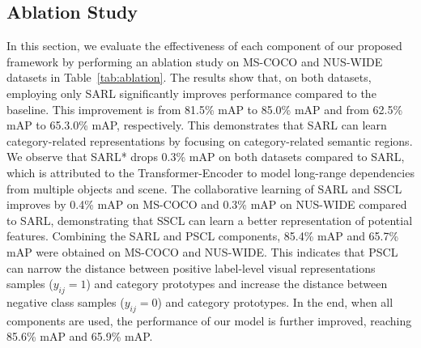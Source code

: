 \documentclass{ecai}
\begin{document}
\subsection{Ablation Study}
In this section, we evaluate the effectiveness of each component of our proposed framework by performing an ablation study on MS-COCO and NUS-WIDE datasets in Table~\ref{tab:ablation}.
The results show that, on both datasets, employing only SARL significantly improves performance compared to the baseline. This improvement is from 81.5\% mAP to 85.0\% mAP and from 62.5\% mAP to 65.3.0\% mAP, respectively.
This demonstrates that SARL can learn category-related representations by focusing on category-related semantic regions.
We observe that SARL* drops 0.3\% mAP on both datasets compared to SARL, which is attributed to the Transformer-Encoder to model long-range dependencies from multiple objects and scene.
The collaborative learning of SARL and SSCL improves by 0.4\% mAP on MS-COCO and 0.3\% mAP on NUS-WIDE compared to SARL, demonstrating that SSCL can learn a better representation of potential features.
Combining the SARL and PSCL components, 85.4\% mAP and 65.7\% mAP were obtained on MS-COCO and NUS-WIDE. This indicates that PSCL can narrow the distance between positive label-level visual representations samples ($y_{ij}\!=\!1$) and category prototypes and increase the distance between negative class samples ($y_{ij}\!=\!0$) and category prototypes. In the end, when all components are used, the performance of our model is further improved, reaching 85.6\% mAP and 65.9\% mAP.
\end{document}
